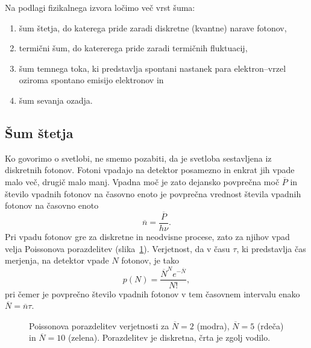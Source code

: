 Na podlagi fizikalnega izvora ločimo več vrst šuma:
\begin{enumerate}
\item šum štetja, do katerega pride zaradi diskretne (kvantne) narave fotonov,
\item termični šum, do katererega pride zaradi termičnih fluktuacij,
\item šum temnega toka, ki predstavlja spontani nastanek para elektron--vrzel oziroma spontano
emisijo elektronov in
\item šum sevanja ozadja.
\end{enumerate}

\subsection*{Šum štetja} 
Ko govorimo o svetlobi, ne smemo pozabiti, da je svetloba sestavljena iz diskretnih fotonov. 
Fotoni vpadajo na detektor posamezno in enkrat jih vpade malo več, 
drugič malo manj. Vpadna moč je zato dejansko povprečna moč $\overline{P}$ in število 
vpadnih fotonov na časovno enoto je povprečna vrednost števila vpadnih fotonov na časovno enoto
\begin{equation}
\overline{n} = \frac{\overline{P}}{h\nu}.
\end{equation}
Pri vpadu fotonov gre za diskretne in neodvisne procese, zato za njihov vpad velja
Poissonova porazdelitev (slika~\ref{11_Poiss}). Verjetnost, da v času $\tau$, ki predstavlja 
čas merjenja, na detektor vpade $N$ fotonov, je tako 
\begin{equation}
p(N) = \frac{\overline{N}^N e^{-\overline{N}}}{N!},
\label{Poisson}
\end{equation}
pri čemer je povprečno število vpadnih fotonov v tem časovnem intervalu 
enako $\overline{N} = \overline{n}\tau$.
\begin{figure}[h]
\centering
\def\svgwidth{90truemm} 

\caption{Poissonova porazdelitev verjetnosti za $\overline{N}=2$ (modra), 
$\overline{N}=5$ (rdeča) in $\overline{N}=10$ (zelena). Porazdelitev je 
diskretna, črta je zgolj vodilo.}
\label{11_Poiss}
\end{figure}

